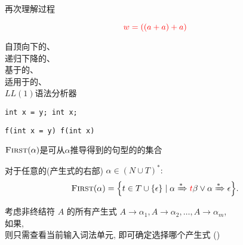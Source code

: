 \begin{frame}{}
  \begin{center}
    再次理解过程


    \vspace{-0.80cm}
    \[
      \textcolor{red}{w = ((a + a) + a)}
    \]
  \end{center}
\end{frame}

\begin{frame}{}
  \begin{center}
    自顶向下的、\\[15pt]
    递归下降的、\\[15pt]
    基于的、\\[15pt]
    适用于的、\\[15pt]
    $LL(1)$语法分析器
  \end{center}
\end{frame}

\begin{frame}{}
  \begin{center}

    \pause
    \vspace{0.30cm}
    \texttt{int x = y; \qquad int x;}

    \vspace{0.20cm}
    \texttt{f(int x = y) \qquad f(int x)}
  \end{center}
\end{frame}

\begin{frame}{}
  \begin{center}

    \vspace{0.60cm}
    $\textsc{First}(\alpha)$是可从$\alpha$推导得到的句型的的集合
    \begin{definition}
      对于任意的(产生式的右部) $\alpha \in (N \cup T)^{\ast}:$
      \[
        \textsc{First}(\alpha) = \Big\{t \in T \cup \{\epsilon\}
          \mid \alpha \xRightarrow[]{\ast} \textcolor{red}{t}\beta \lor \alpha \xRightarrow[]{\ast} \epsilon \Big\}.
      \]
    \end{definition}

    \pause
    \vspace{0.60cm}
    考虑非终结符 $A$ 的所有产生式
    $A \to \alpha_{1}, A \to \alpha_{2}, \dots, A \to \alpha_{m}$, \\[4pt]
    如果, \\[4pt]
    则只需查看当前输入词法单元, 即可确定选择哪个产生式 ()
  \end{center}
\end{frame}

